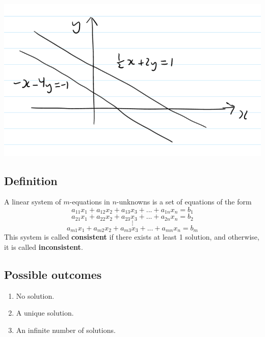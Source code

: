 \documentclass[11pt]{article}
\begin{document}
\begin{enumerate}[ (a) ]
\begin{center} \includegraphics[scale=0.5]{linear_system_parallel} \end{center}


\end{enumerate}

\subsection{Definition}
A linear system of $m$-equations in $n$-unknowns is a set of equations of the form
\[ a_{11}x_1 + a_{12}x_2 + a_{13}x_3 + ... + a_{1n}x_n = b_1    \]
\[ a_{21}x_1 + a_{22}x_2 + a_{23}x_3 + ... + a_{2n}x_n = b_2 \]
\[ \vdots \]
\[ a_{m1}x_1 + a_{m2}x_2 + a_{m3}x_3 + ... + a_{mn}x_n = b_m \]
This system is called \textbf{consistent} if there exists at least 1 solution, and otherwise, it is called \textbf{inconsistent}.

\subsection*{Possible outcomes}
\begin{enumerate}[ (i) ]
\item No solution.
\item A unique solution.
\item An infinite number of solutions.
\end{enumerate}
\end{document}
